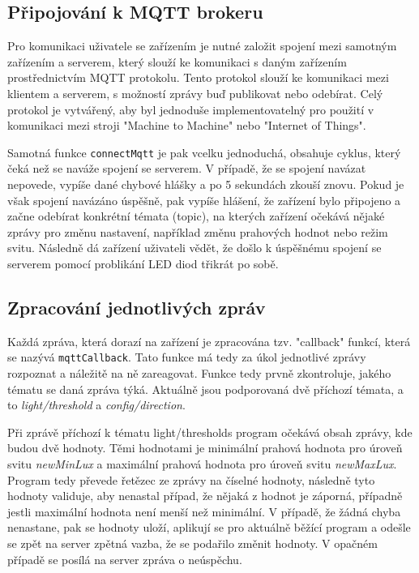 \documentclass[a4paper, 11pt, hidelinks]{article}
\begin{document}
\subsection{Připojování k MQTT brokeru}
Pro komunikaci uživatele se zařízením je nutné založit spojení mezi samotným zařízením a serverem, který slouží ke komunikaci s daným zařízením prostřednictvím MQTT protokolu. Tento protokol slouží ke komunikaci mezi klientem a serverem, s možností zprávy buď publikovat nebo odebírat. Celý protokol je vytvářený, aby byl jednoduše implementovatelný pro použití v komunikaci mezi stroji "Machine to Machine" nebo "Internet of Things". \cite{MQTT} 

Samotná funkce \texttt{connectMqtt} je pak vcelku jednoduchá, obsahuje cyklus, který čeká než se naváže spojení se serverem. V případě, že se spojení navázat nepovede, vypíše dané chybové hlášky a po 5 sekundách zkouší znovu. Pokud je však spojení navázáno úspěšně, pak vypíše hlášení, že zařízení bylo připojeno a začne odebírat konkrétní témata (topic), na kterých zařízení očekává nějaké zprávy pro změnu nastavení, například změnu prahových hodnot nebo režim svitu. Následně dá zařízení uživateli vědět, že došlo k úspěšnému spojení se serverem pomocí problikání LED diod třikrát po sobě.

\subsection{Zpracování jednotlivých zpráv}
Každá zpráva, která dorazí na zařízení je zpracována tzv. "callback" funkcí, která se nazývá \texttt{mqttCallback}. Tato funkce má tedy za úkol jednotlivé zprávy rozpoznat a náležitě na ně zareagovat. Funkce tedy prvně zkontroluje, jakého tématu se daná zpráva týká. Aktuálně jsou podporovaná dvě příchozí témata, a to \textit{light/threshold} a \textit{config/direction}. 

Při zprávě příchozí k tématu light/thresholds program očekává obsah zprávy, kde budou dvě hodnoty. Těmi hodnotami je minimální prahová hodnota pro úroveň svitu \textit{newMinLux} a maximální prahová hodnota pro úroveň svitu \textit{newMaxLux}. Program tedy převede řetězec ze zprávy na číselné hodnoty, následně tyto hodnoty validuje, aby nenastal případ, že nějaká z hodnot je záporná, případně jestli maximální hodnota není menší než minimální. V případě, že žádná chyba nenastane, pak se hodnoty uloží, aplikují se pro aktuálně běžící program a odešle se zpět na server zpětná vazba, že se podařilo změnit hodnoty. V opačném případě se posílá na server zpráva o neúspěchu.
\end{document}
